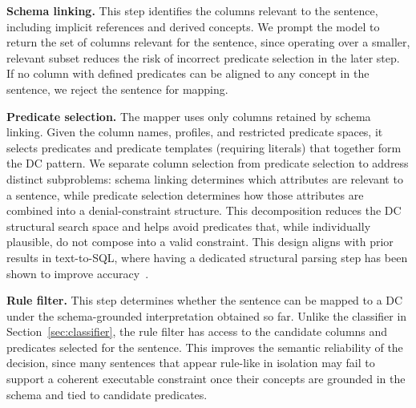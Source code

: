 \smallskip\noindent\textbf{Schema linking.}
This step identifies the columns relevant to the sentence, including implicit 
references and derived concepts. We prompt the model to return the set of columns relevant for the sentence, since operating over a smaller, relevant subset reduces the risk of incorrect predicate selection in the later step. If no column with defined predicates can be aligned to any concept in the sentence, we reject the sentence for mapping.

\smallskip\noindent\textbf{Predicate selection.} The mapper uses only columns retained by schema linking. Given the column names, profiles, and restricted predicate spaces, it selects predicates and predicate templates (requiring literals) that together form the DC pattern. We separate column selection from predicate selection to address distinct subproblems: schema linking determines which attributes are relevant to a sentence, while predicate selection determines how those attributes are combined into a denial-constraint structure. This decomposition reduces the DC structural search space and helps avoid predicates that, while individually plausible, do not compose into a valid constraint. This design aligns with prior results in text-to-SQL, where having a dedicated structural parsing step has been shown to improve accuracy~\cite{resdsql2023}.

\smallskip\noindent\textbf{Rule filter.}
This step determines whether the sentence can be mapped to a DC under the schema-grounded interpretation obtained so far. Unlike the classifier in Section~\ref{sec:classifier}, the rule filter has access to the candidate columns and predicates selected for the sentence. This improves the semantic reliability of the decision, since many sentences that appear rule-like in isolation may fail to support a coherent executable constraint once their concepts are grounded in the schema and tied to candidate predicates. %
%

